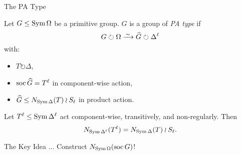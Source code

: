 
\begin{frame}{The PA Type}
    \begin{defn}
        Let $G \leq \operatorname{Sym} \Omega$ be a primitive group.
        $G$ is a group of \emph{PA type} if
        \\[-0.5em]
        \pause
        \[
        G \circlearrowright \Omega
        \iso
        \myhat G \circlearrowright \Delta ^
        \ell
        \]
        with:
        \vspace{-0.5em}
        \pause
        \begin{itemize}
            \item
            $T \circlearrowright \Delta$,
            \pause
            \item
            $\operatorname{soc} \widehat{G} = T ^ \ell$ in component-wise action,
            \pause
            \item
            $\widehat{G} \leq N_{\operatorname{Sym} \Delta}(T) \wr S_\ell$ in product action.
        \end{itemize}
    \end{defn}
    \pause

    \begin{lemma}
        Let $T ^ \ell \leq \operatorname{Sym} \Delta ^ \ell$ act component-wise,
        transitively, and non-regularly. Then
        \\[-1.0em]
        \pause
        \[
        N_{\operatorname{Sym} \Delta ^ \ell}( T ^ \ell ) = N_{\operatorname{Sym} \Delta}(T) \wr S_\ell.
        \]
    \end{lemma}
\end{frame}


\begin{frame}{The Key Idea ...}
    \centering
    {\Large
    Construct $N_{\operatorname{Sym} \Omega}(\operatorname{soc} G)$!
    }
\end{frame}

